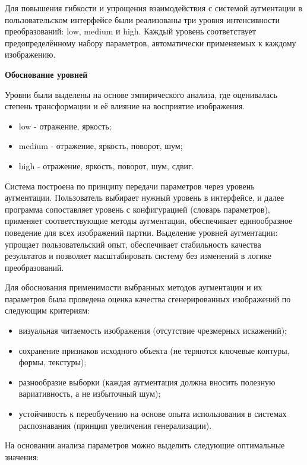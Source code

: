 Для повышения гибкости и упрощения взаимодействия с системой аугментации в пользовательском интерфейсе были реализованы три уровня интенсивности преобразований: low, medium и high. Каждый уровень соответствует предопределённому набору параметров, автоматически применяемых к каждому изображению.

\textbf{Обоснование уровней}

Уровни были выделены на основе эмпирического анализа, где оценивалась степень трансформации и её влияние на восприятие изображения. %
\begin{itemize}
	\item low - отражение, яркость;
	\item medium - отражение, яркость, поворот, шум;
	\item high - отражение, яркость, поворот, шум, сдвиг.
\end{itemize}
	

Система построена по принципу передачи параметров через уровень аугментации. Пользователь выбирает нужный уровень в интерфейсе, и далее программа сопоставляет уровень с конфигурацией (словарь параметров), применяет соответствующие методы аугментации, обеспечивает единообразное поведение для всех изображений партии. Выделение уровней аугментации: упрощает пользовательский опыт, обеспечивает стабильность качества результатов и позволяет масштабировать систему без изменений в логике преобразований.

Для обоснования применимости выбранных методов аугментации и их параметров была проведена оценка качества сгенерированных изображений по следующим критериям:
\begin{itemize}
	\item визуальная читаемость изображения (отсутствие чрезмерных искажений);
	\item сохранение признаков исходного объекта (не теряются ключевые контуры, формы, текстуры);
	\item разнообразие выборки (каждая аугментация должна вносить полезную вариативность, а не избыточный шум);
	\item устойчивость к переобучению на основе опыта использования в системах распознавания (принцип увеличения генерализации).
\end{itemize}

На основании анализа параметров можно выделить следующие оптимальные значения:

